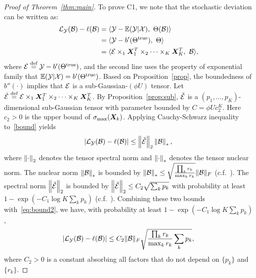\documentclass[12pt]{article}
\theoremstyle{plain}
\theoremstyle{definition}
\begin{document}
\begin{proof}[Proof of Theorem~\ref{thm:main}]
To prove C1, we note that the stochastic deviation can be written as:
\begin{align}\label{bound}
\tL_{\tY}(\tB)-\ell(\tB)&=\langle \tY-\mathbb{E}(\tY|\tX),\ \Theta(\tB)\rangle\notag \\
&= \langle \tY- b'(\trueT),\ \Theta\rangle \notag \\
&= \langle \tE\times_1\mX^T_1\times_2\cdots\times_K\mX^T_K,\ \tB\rangle,
\end{align}
where $\mathcal{E}\stackrel{\text{def}}{=}\mathcal{Y}-b'(\Theta^{\text{true}})$, and the second line uses the property of exponential family that $\mathbb{E}(\mathcal{Y}|\mathcal{X})=b'(\Theta^{\text{true}})$. Based on Proposition~\ref{prop}, the boundedness of $b''(\cdot)$ implies that $\mathcal{E}$ is a sub-Gaussian-$(\phi U)$ tensor. Let $\check{\mathcal{E}}\stackrel{\text{def}}{=}\mathcal{E}\times_1\bm X^T_1\times_2\cdots\times_K\bm X^T_K$. By Proposition~\ref{prop:sub}, $\check {\mathcal{E}}$ is a $(p_1,\ldots,p_K)$-dimensional sub-Gaussian tensor with parameter bounded by $C=\phi Uc^{K}_2$. Here $c_2>0$ is the upper bound of $\sigma_{\max}(\bm X_k)$. Applying Cauchy-Schwarz inequality to~\eqref{bound} yields
\begin{equation}\label{eq:bound2}
|\mathcal{L}_{\mathcal{Y}}(\mathcal{B})-\ell(\mathcal{B})|\leq \left\lVert\check {\mathcal{E}}\right\rVert_2 \left\lVert\mathcal{B}\right\rVert_*,
\end{equation}
where $\left\lVert\cdot\right\rVert_2$ denotes the tensor spectral norm and $\left\lVert\cdot\right\rVert_*$ denotes the tensor nuclear norm. The nuclear norm $\left\lVert\mathcal{B}\right\rVert_*$ is  bounded by $\left\lVert\mathcal{B}\right\rVert_*\leq \sqrt{{\prod_k r_k \over \max_k r_k}}\lVert\mathcal{B}\rVert_F$ (c.f.~\citep{wang2018learning,wang2017operator}). The spectral norm $\left\lVert\check {\mathcal{E}}\right\rVert_2$ is bounded by $\left\lVert\check {\mathcal{E}}\right\rVert_2\leq C_2 \sqrt{\sum_k p_k}$ with probability at least $1-\exp(-C_1\log K \sum_kp_k)$ (c.f.~\citep{wang2018learning,tomioka2014spectral}). Combining these two bounds with~\eqref{eq:bound2}, we have, with probability at least $1-\exp(-C_1\log K \sum_kp_k)$, 
\[
|\mathcal{L}_{\mathcal{Y}}(\mathcal{B})-\ell(\mathcal{B})|\leq C_2\lVert\mathcal{B}\rVert_F  \sqrt{ {\prod_k r_k\over \max_k r_k}\sum_k p_k},
\]
where $C_2>0$ is a constant absorbing all factors that do not depend on $\{p_k\}$ and $\{r_k\}$. 


\end{proof}
\end{document}
